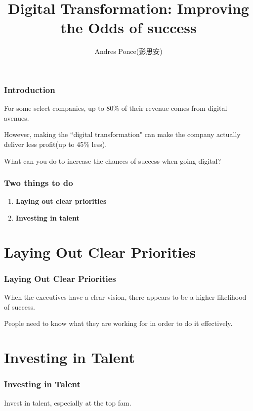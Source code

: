 \documentclass{beamer}
\title{Digital Transformation: Improving the Odds of success}
\author{Andres Ponce(彭思安)}
\institute{National Chiao 你Tung University}
\begin{document}
\maketitle

\begin{frame}
	\frametitle{Introduction}
	For some select companies, up to 80\% of their revenue comes
	from digital avenues.\pause

	However, making the ``digital transformation" can make the company 
	actually deliver less profit(up to 45\% less).\pause

	What can you do to increase the chances of success when going digital?
\end{frame}

\begin{frame}
	\frametitle{Two things to do}
		\begin{enumerate}
			\item{\textbf{Laying out clear priorities}}\pause
			\item{\textbf{Investing in talent}}
		\end{enumerate}
\end{frame}

\section{Laying Out Clear Priorities}
\begin{frame}
	\frametitle{Laying Out Clear Priorities}
	When the executives have a clear vision, there appears
	to be a higher likelihood of success.\pause

	People need to know what they are working for in order to 
	do it effectively.
\end{frame}

\section{Investing in Talent}
\begin{frame}
	\frametitle{Investing in Talent}
	Invest in talent, especially at the top fam.
\end{frame}
\end{document}
